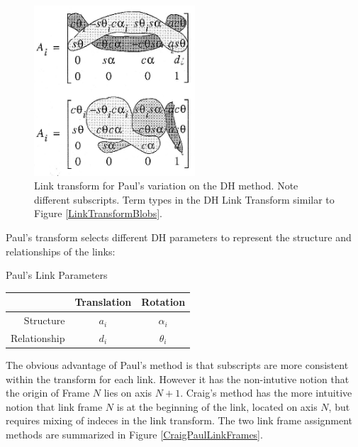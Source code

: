 \begin{figure}\centering
\includegraphics[width=60mm]{figs03/00713.eps}
\caption{Link transform for Paul's variation on the DH method.  Note different subscripts. Term types in the DH Link Transform similar to Figure \ref{LinkTransformBlobs}. }\label{PaulTransformBlobs}
\end{figure}


Paul's transform selects different DH parameters to represent the structure and relationships of the links:

\begin{center}
Paul's Link Parameters \\
\begin{tabular}{r|cc}
            & Translation & Rotation \\ \hline
Structure   &  $a_{i}$ & $\alpha_{i}$  \\
Relationship &  $d_i$      & $\theta_i $    \\
\end{tabular}
\end{center}

The obvious advantage of Paul's method is that subscripts are more consistent within the transform for each link.  However it has the non-intutive notion that the origin of Frame $N$ lies on axis $N+1$.  Craig's method has the more intuitive notion that  link frame $N$ is at the beginning of the link, located on axis $N$, but requires mixing of indeces in the link transform.  The two link frame assignment methods are summarized in Figure \ref{CraigPaulLinkFrames}.

